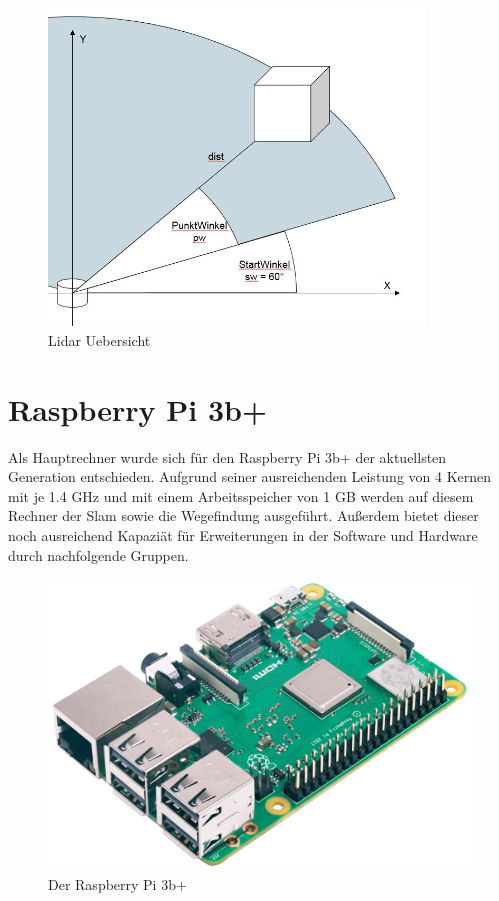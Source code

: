 \begin{figure}[h]
\begin{center}
\includegraphics[width=10cm]{images/chapter5/LidarWinkeluebersicht.jpg}
\caption{Lidar Uebersicht}
\label{Lidar_uebersicht}
\end{center}
\end{figure}

\section{Raspberry Pi 3b+}

Als Hauptrechner wurde sich für den Raspberry Pi 3b+ der aktuellsten Generation entschieden. Aufgrund seiner ausreichenden Leistung von 4 Kernen mit je 1.4 GHz und mit einem Arbeitsspeicher von 1 GB werden auf diesem Rechner der Slam sowie die Wegefindung ausgeführt. Außerdem bietet dieser noch ausreichend Kapaziät für Erweiterungen in der Software und Hardware durch nachfolgende Gruppen.  


\begin{figure}[hbtp]
\centering
\includegraphics[scale=0.1]{images/chapter5/raspberry.png}
\caption{Der Raspberry Pi 3b+ \cite{raspberry.2018}}
\label{fig:raspberry}
\end{figure}






